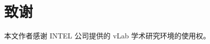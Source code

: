 \documentclass{cjc}
\begin{document}
\section*{致谢}

  本文作者感谢 INTEL 公司提供的 vLab 学术研究环境的使用权。

















\end{document}
